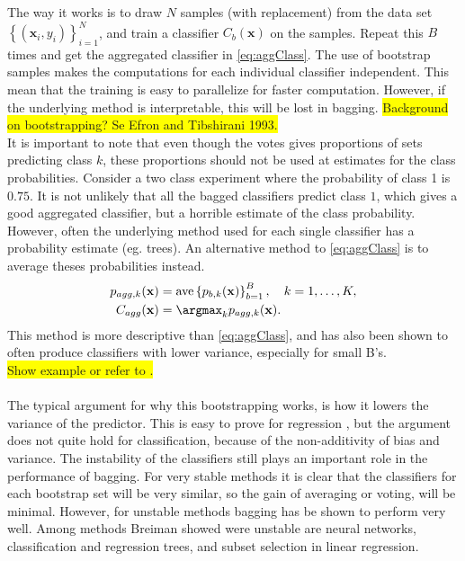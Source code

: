 The way it works is to draw $N$ samples (with replacement) from the data set $\left\{ (\mathbf{x}_i, y_i) \right\}_{i=1}^{N}$, and train a classifier $C_b(\mathbf{x})$ on the samples. Repeat this $B$ times and get the aggregated classifier in  \eqref{eq:aggClass}. The use of bootstrap samples makes the computations for each individual classifier independent. This mean that the training is easy to parallelize for faster computation. However, if the underlying method is interpretable, this will be lost in bagging.
\colorbox{yellow}{Background on bootstrapping? Se Efron and Tibshirani 1993.} \\
It is important to note that even though the votes gives proportions of sets predicting class $k$, these proportions should not be used at estimates for the class probabilities. Consider a two class experiment where the probability of class 1 is $0.75$. It is not unlikely that all the bagged classifiers predict class $1$, which gives a good aggregated classifier, but a horrible estimate of the class probability. However, often the underlying method used for each single classifier has a probability estimate (eg. trees). An alternative method to \eqref{eq:aggClass} is to average theses probabilities instead.
\begin{align}
  p_{agg, k}(\mathbf{x}) &=  \mathrm{ave}\left\{ p_{b, k}(\mathbf{x}) \right\}_{b = 1}^{B}, \quad k = 1, \ldots, K, \\
  \label{eq:aggClassP} 
  C_{agg}(\mathbf{x}) &= \argmax_k p_{agg, k}(\mathbf{x}).
\end{align}
This method is more descriptive than \eqref{eq:aggClass}, and has also been shown to often produce classifiers with lower variance, especially for small B's.\\
\colorbox{yellow}{Show example or refer to \cite[8.7]{modstat}.}
\\
\\
The typical argument for why this bootstrapping works, is how it lowers the variance of the predictor. This is easy to prove for regression \cite{modstat}, but the argument does not quite hold for classification, because of the non-additivity of bias and variance. The instability of the classifiers still plays an important role in the performance of bagging. For very stable methods it is clear that the classifiers for each bootstrap set will be very similar, so the gain of averaging or voting, will be minimal. However, for unstable methods bagging has be shown to perform very well. Among methods Breiman showed were unstable are neural networks, classification and regression trees, and subset selection in linear regression.

